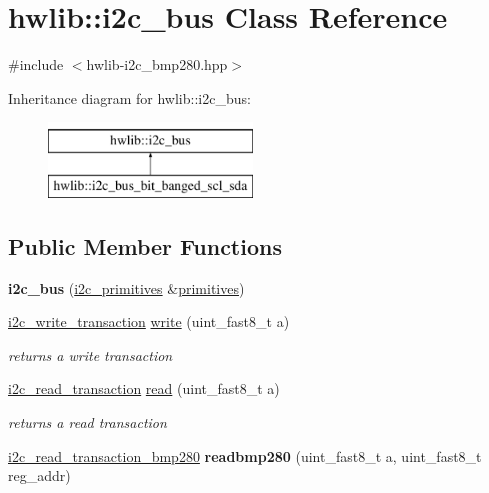 \hypertarget{classhwlib_1_1i2c__bus}{}\section{hwlib\+::i2c\+\_\+bus Class Reference}
\label{classhwlib_1_1i2c__bus}


{\ttfamily \#include $<$hwlib-\/i2c\+\_\+bmp280.\+hpp$>$}

Inheritance diagram for hwlib\+::i2c\+\_\+bus\+:\begin{figure}[H]
\begin{center}
\leavevmode
\includegraphics[height=2.000000cm]{classhwlib_1_1i2c__bus}
\end{center}
\end{figure}
\subsection*{Public Member Functions}
\begin{DoxyCompactItemize}
\item 
\mbox{\label{classhwlib_1_1i2c__bus_a997b8940b11b41bcaad065ea992170da}} 
{\bfseries i2c\+\_\+bus} (\mbox{\hyperlink{classhwlib_1_1i2c__primitives}{i2c\+\_\+primitives}} \&\mbox{\hyperlink{classhwlib_1_1i2c__bus_a676f1d61bce4122a7d446a42f749d567}{primitives}})
\item 
\mbox{\label{classhwlib_1_1i2c__bus_ad0b808c4d9b1ed7b16ee13c735c25597}} 
\mbox{\hyperlink{classhwlib_1_1i2c__write__transaction}{i2c\+\_\+write\+\_\+transaction}} \mbox{\hyperlink{classhwlib_1_1i2c__bus_ad0b808c4d9b1ed7b16ee13c735c25597}{write}} (uint\+\_\+fast8\+\_\+t a)
\begin{DoxyCompactList}\small\item\em returns a write transaction \end{DoxyCompactList}\item 
\mbox{\label{classhwlib_1_1i2c__bus_ac4dd659c140ae5f8f7d6bbd48351d88f}} 
\mbox{\hyperlink{classhwlib_1_1i2c__read__transaction}{i2c\+\_\+read\+\_\+transaction}} \mbox{\hyperlink{classhwlib_1_1i2c__bus_ac4dd659c140ae5f8f7d6bbd48351d88f}{read}} (uint\+\_\+fast8\+\_\+t a)
\begin{DoxyCompactList}\small\item\em returns a read transaction \end{DoxyCompactList}\item 
\mbox{\label{classhwlib_1_1i2c__bus_aefc6bff68d03be9f17f1954b02ee3aee}} 
\mbox{\hyperlink{classhwlib_1_1i2c__read__transaction__bmp280}{i2c\+\_\+read\+\_\+transaction\+\_\+bmp280}} {\bfseries readbmp280} (uint\+\_\+fast8\+\_\+t a, uint\+\_\+fast8\+\_\+t reg\+\_\+addr)
\end{DoxyCompactItemize}

